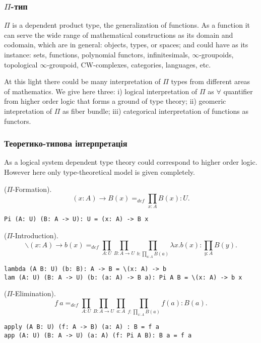 \subsubsection{$\Pi$-тип}
$\Pi$ is a dependent product type, the generalization of functions.
As a function it can serve the wide range of mathematical constructions
as its domain and codomain, which are in general: objects, types, or spaces;
and could have as its instance: sets, functions, polynomial functors,
infinitesimals, $\infty$-groupoids, topological $\infty$-groupoid, CW-complexes,
categories, languages, etc.

At this light there could be many interpretation of $\Pi$ types from different
areas of mathematics. We give here three: i) logical interpretation of $\Pi$ as
$\forall$ quantifier from higher order logic
that forms a ground of type theory; ii) geomeric intepretation of $\Pi$ as fiber bundle;
iii) categorical interpretation of functions as functors.

\subsubsection*{Теоретико-типова інтерпретація}
As a logical system dependent type theory could correspond to higher order logic.
However here only type-theoretical model is given completely.

\begin{definition} ($\Pi$-Formation).
$$(x: A) \rightarrow B(x) =_{def} \prod_{x:A}B(x) : U.$$
\begin{lstlisting}
Pi (A: U) (B: A -> U): U = (x: A) -> B x
\end{lstlisting}
\end{definition}

\begin{definition} ($\Pi$-Introduction).
$$\backslash (x: A) \rightarrow b(x) =_{def} \prod_{A:U}\prod_{B:A \rightarrow U}\prod_{b:\prod_{a:A}B(a)}\lambda x.b(x) : \prod_{y:A}B(y).$$
\begin{lstlisting}
lambda (A B: U) (b: B): A -> B = \(x: A) -> b
lam (A: U) (B: A -> U) (b: (a: A) -> B a): Pi A B = \(x: A) -> b x
\end{lstlisting}
\end{definition}

\begin{definition} ($\Pi$-Elimination).
$$f\ a =_{def} \prod_{A:U}\prod_{B: A \rightarrow U}\prod_{a:A}\prod_{f: \prod_{x:A}B(a)}f(a) : B(a).$$
\begin{lstlisting}
apply (A B: U) (f: A -> B) (a: A) : B = f a
app (A: U) (B: A -> U) (a: A) (f: Pi A B): B a = f a
\end{lstlisting}
\end{definition}

